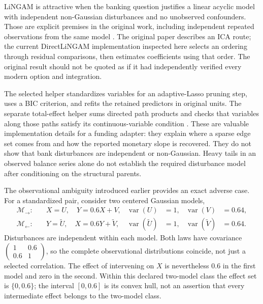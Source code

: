 LiNGAM is attractive when the banking question justifies a linear acyclic model
with independent non-Gaussian disturbances and no unobserved confounders. Those
are explicit premises in the original work, including independent repeated
observations from the same model \citep{exec13_pydisc_shimizu2006}. The original
paper describes an ICA route; the current DirectLiNGAM implementation inspected
here selects an ordering through residual comparisons, then estimates
coefficients using that order. The original result should not be quoted as
if it had independently verified every modern option and integration.

The selected helper standardizes variables for an adaptive-Lasso pruning step,
uses a BIC criterion, and refits the retained predictors in original units.
The separate total-effect helper sums directed path products and checks that
variables along those paths satisfy its continuous-variable condition
\citep{exec13_pydisc_lingam}. These are valuable implementation details for a
funding adapter: they explain where a sparse edge set comes from and how the
reported monetary slope is recovered. They do not show that bank disturbances
are independent or non-Gaussian. Heavy tails in an observed balance series
alone do not establish the required disturbance model after conditioning on
the structural parents.

The observational ambiguity introduced earlier provides an exact adverse case.
For a standardized pair, consider two centered Gaussian models,
\begin{align}
 \mathcal M_{\to}:&\quad X=U,\quad Y=0.6X+V,
     &\operatorname{var}(U)&=1,&\operatorname{var}(V)&=0.64,\\
 \mathcal M_{\leftarrow}:&\quad Y=\widetilde U,\quad X=0.6Y+\widetilde V,
     &\operatorname{var}(\widetilde U)&=1,&\operatorname{var}(\widetilde V)&=0.64.
\end{align}
Disturbances are independent within each model. Both laws have covariance
\(\left(\begin{smallmatrix}1&0.6\\0.6&1\end{smallmatrix}\right)\), so the
complete observational distributions coincide, not just a selected correlation.
The effect of intervening on \(X\) is nevertheless \(0.6\) in the first model
and zero in the second. Within this declared two-model class the effect set is
\(\{0,0.6\}\); the interval \([0,0.6]\) is its convex hull, not an assertion
that every intermediate effect belongs to the two-model class.

